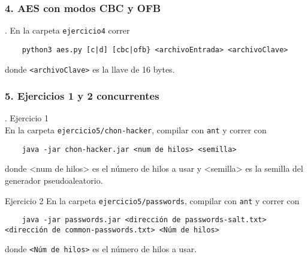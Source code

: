 \documentclass[14pt]{article}
\begin{document}
\subsubsection*{4. AES con modos CBC y OFB}.
En la carpeta \texttt{ejercicio4} correr
\begin{verbatim}
    python3 aes.py [c|d] [cbc|ofb} <archivoEntrada> <archivoClave>
\end{verbatim}
donde \texttt{<archivoClave>} es la llave de 16 bytes.

\subsubsection*{5. Ejercicios 1 y 2 concurrentes}.
\textsf{Ejercicio 1} \\
En la carpeta \texttt{ejercicio5/chon-hacker}, compilar con \texttt{ant} y correr con
\begin{verbatim}
    java -jar chon-hacker.jar <num de hilos> <semilla>
\end{verbatim}
donde <num de hilos> es el número de hilos a usar y <semilla> es la semilla del generador pseudoaleatorio.

\textsf{Ejercicio 2}
En la carpeta \texttt{ejercicio5/passwords}, compilar con \texttt{ant} y correr con
\begin{verbatim}
    java -jar passwords.jar <dirección de passwords-salt.txt> <dirección de common-passwords.txt> <Núm de hilos>
\end{verbatim}
donde \texttt{<Núm de hilos>} es el número de hilos a usar.
\end{document}
